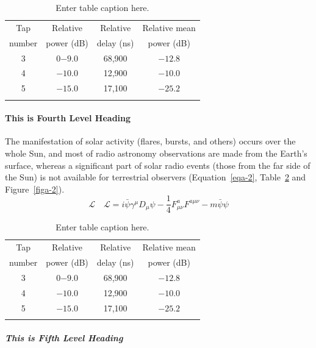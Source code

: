 \begin{table}
\caption{Enter table caption here.\label{taba-1}}{%
\begin{tabular}{@{}cccc@{}}
\toprule
Tap     &Relative   &Relative   &Relative mean\\
number  &power (dB) &delay (ns) &power (dB)\\
\midrule
3 &0$-9.0$  &68,900\footnotemark[1] &$-12.8$\\
4 &$-10.0$ &12,900\footnotemark[2] &$-10.0$\\
5 &$-15.0$ &17,100 &$-25.2$\\
\botrule
\end{tabular}}{
}
\end{table}

\paragraph{This is Fourth Level Heading}
\lipsum[5]

The manifestation of solar activity (flares, bursts, and others) occurs over the whole Sun, and most of radio astronomy observations are made from the Earth's surface, whereas a significant part of solar radio events (those from the far side of the Sun) is not available for terrestrial observers (Equation~\ref{eqa-2}, Table~\ref{taba-2} and Figure~\ref{figa-2}).
\begin{equation}
\mathcal{L}\quad \mathbf{\mathcal{L}} = i \bar{\psi} \gamma^\mu D_\mu \psi - 
\frac{1}{4} F_{\mu\nu}^a F^{a\mu\nu} - m \bar{\psi} \psi\label{eqa-2}
\end{equation}

\begin{table}
\caption{Enter table caption here.\label{taba-2}}{%
\begin{tabular}{@{}cccc@{}}
\toprule
Tap     &Relative   &Relative   &Relative mean\\
number  &power (dB) &delay (ns) &power (dB)\\
\midrule
3 &0$-9.0$  &68,900\footnotemark[1] &$-12.8$\\
4 &$-10.0$ &12,900\footnotemark[2] &$-10.0$\\
5 &$-15.0$ &17,100 &$-25.2$\\
\botrule
\end{tabular}}{
}
\end{table}

\subparagraph{This is Fifth Level Heading}
\lipsum[6]

